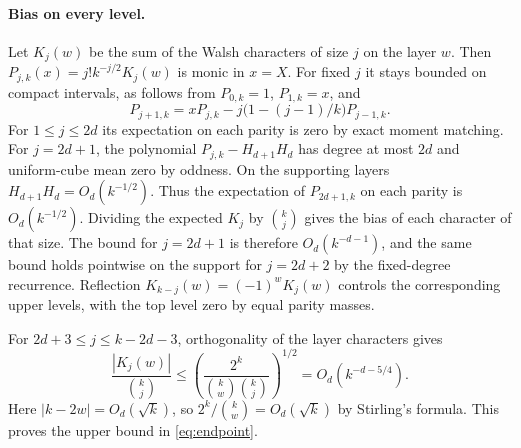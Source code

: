 \paragraph{Bias on every level.}
Let $K_j(w)$ be the sum of the Walsh characters of size $j$ on the layer
$w$. Then $P_{j,k}(x)=j!k^{-j/2}K_j(w)$ is monic in $x=X$. For fixed $j$
it stays bounded on compact intervals, as follows from $P_{0,k}=1$,
$P_{1,k}=x$, and
\[
 P_{j+1,k}=xP_{j,k}-j\bigl(1-(j-1)/k\bigr)P_{j-1,k}.
\]
For $1\le j\le 2d$ its expectation on each parity is zero by exact moment
matching. For $j=2d+1$, the polynomial $P_{j,k}-H_{d+1}H_d$ has degree at
most $2d$ and uniform-cube mean zero by oddness. On the supporting layers
$H_{d+1}H_d=O_d(k^{-1/2})$. Thus the expectation of $P_{2d+1,k}$ on each
parity is $O_d(k^{-1/2})$. Dividing the expected $K_j$ by $\binom{k}{j}$
gives the bias of each character of that size. The bound for $j=2d+1$ is
therefore $O_d(k^{-d-1})$, and the same bound holds pointwise on the
support for $j=2d+2$ by the fixed-degree recurrence. Reflection
$K_{k-j}(w)=(-1)^wK_j(w)$ controls the corresponding upper levels, with
the top level zero by equal parity masses.

For $2d+3\le j\le k-2d-3$, orthogonality of the layer characters gives
\[
 \frac{|K_j(w)|}{\binom{k}{j}}
  \le \left(\frac{2^k}{\binom{k}{w}\binom{k}{j}}\right)^{1/2}
  = O_d(k^{-d-5/4}).
\]
Here $|k-2w|=O_d(\sqrt{k})$, so $2^k/\binom{k}{w}=O_d(\sqrt{k})$ by
Stirling's formula. This proves the upper bound in \eqref{eq:endpoint}.
